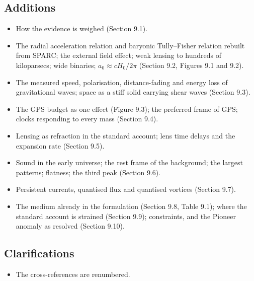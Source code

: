 \documentclass[11pt,a4paper]{article}
\begin{document}
\subsection*{Additions}
\begin{itemize}
\item How the evidence is weighed (Section 9.1).
\item The radial acceleration relation and baryonic Tully--Fisher relation rebuilt from SPARC; the external field effect; weak lensing to hundreds of kiloparsecs; wide binaries; $a_0 \approx cH_0/2\pi$ (Section 9.2, Figures 9.1 and 9.2).
\item The measured speed, polarisation, distance-fading and energy loss of gravitational waves; space as a stiff solid carrying shear waves (Section 9.3).
\item The GPS budget as one effect (Figure 9.3); the preferred frame of GPS; clocks responding to every mass (Section 9.4).
\item Lensing as refraction in the standard account; lens time delays and the expansion rate (Section 9.5).
\item Sound in the early universe; the rest frame of the background; the largest patterns; flatness; the third peak (Section 9.6).
\item Persistent currents, quantised flux and quantised vortices (Section 9.7).
\item The medium already in the formulation (Section 9.8, Table 9.1); where the standard account is strained (Section 9.9); constraints, and the Pioneer anomaly as resolved (Section 9.10).
\end{itemize}

\subsection*{Clarifications}
\begin{itemize}
\item The cross-references are renumbered.
\end{itemize}


\end{document}
